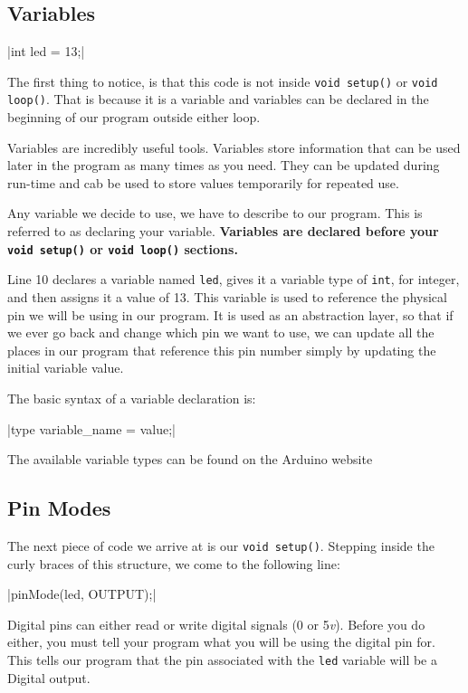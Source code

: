 \documentclass[11pt,a4paper]{article}
\begin{document}
\subsection{Variables} %
\label{sub:variables}

|int led = 13;|

The first thing to notice, is that this code is not inside \texttt{void setup()} or \texttt{void loop()}.  That is because it is a variable and variables can be declared in the beginning of our program outside either loop. 

Variables are incredibly useful tools.  Variables store information that can be used later in the program as many times as you need.  They can be updated during run-time and cab be used to store values temporarily for repeated use.

Any variable we decide to use, we have to describe to our program.  This is referred to as declaring your variable.  \textbf{Variables are declared before your \texttt{void setup()} or \texttt{void loop()} sections.}  

Line 10 declares a variable named \texttt{led}, gives it a variable type of \texttt{int}, for integer, and then assigns it a value of 13.  This variable is used to reference the physical pin we will be using in our program.  It is used as an abstraction layer, so that if we ever go back and change which pin we want to use, we can update all the places in our program that reference this pin number simply by updating the initial variable value.

The basic syntax of a variable declaration is: 

|type variable_name = value;|

The available variable types can be found on the Arduino website \cite{ard_ref}


\subsection{Pin Modes} %
\label{sub:pin_modes}

The next piece of code we arrive at is our \texttt{void setup()}.  Stepping inside the curly braces of this structure, we come to the following line:

|pinMode(led, OUTPUT);|

Digital pins can either read or write digital signals (0 or 5\emph{v}).  Before you do either, you must tell your program what you will be using the digital pin for.  This tells our program that the pin associated with the \texttt{led} variable will be a Digital output.
\end{document}
